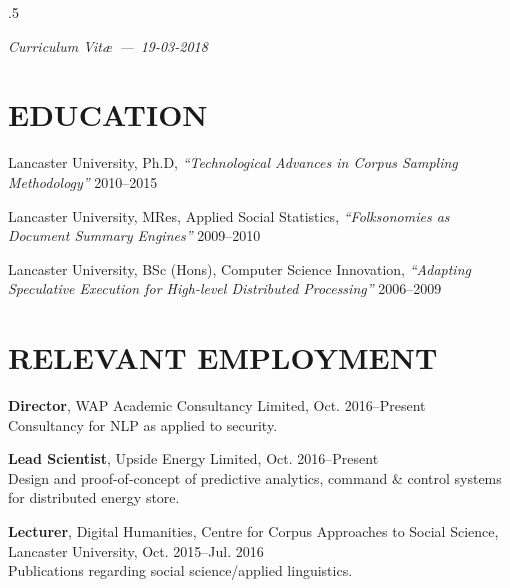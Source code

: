 \documentclass{res}
\begin{document}
\thispagestyle{empty} %
\address{\\
\texttt{\ \ \ \ \ <steve@watt.am>}\\
\texttt{http://stephenwattam.com/}}


\begin{resume}
\vspace{0.2in}
\moveleft.5\sectionwidth\centerline{\it Curriculum Vit\ae~---~19-03-2018}

\section{EDUCATION}
\vspace{0.1in}


    Lancaster University, Ph.D,
    \textit{``Technological Advances in Corpus Sampling Methodology''}
    2010--2015

    Lancaster University, MRes,
    Applied Social Statistics,
    \textit{``Folksonomies as Document Summary \mbox{Engines}''}
    2009--2010

    Lancaster University, BSc (Hons),
    Computer Science Innovation,
    \textit{``Adapting Speculative Execution for High-level Distributed Processing''}
    2006--2009



\section{RELEVANT EMPLOYMENT}
\vspace{0.1in}

    {\bf Director},
    WAP Academic Consultancy Limited,
    Oct. 2016--Present\\ 
    Consultancy for NLP as applied to security.

    {\bf Lead Scientist},
    Upside Energy Limited,
    Oct. 2016--Present\\
    Design and proof-of-concept of predictive analytics, command \& control systems for distributed energy store.

    {\bf Lecturer},
    Digital Humanities, Centre for Corpus Approaches to Social Science,
    Lancaster University,
    Oct. 2015--Jul. 2016\\
    Publications regarding social science/applied linguistics.
    

\end{resume}
\end{document}
